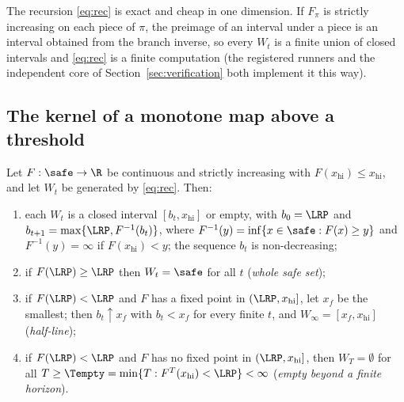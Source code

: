 The recursion \eqref{eq:rec} is exact and cheap in one dimension. If $F_\pi$ is strictly increasing on each piece of $\pi$, the preimage of an interval under a piece is an interval obtained from the branch inverse, so every $W_t$ is a finite union of closed intervals and \eqref{eq:rec} is a finite computation (the registered runners and the independent core of Section~\ref{sec:verification} both implement it this way).

\subsection{The kernel of a monotone map above a threshold}

\begin{theorem}\label{thm:kernel}
Let $F:\safe\to\R$ be continuous and strictly increasing with $F(x_{\mathrm{hi}})\le x_{\mathrm{hi}}$, and let $W_t$ be generated by \eqref{eq:rec}. Then:
\begin{enumerate}[label=(\alph*)]
\item each $W_t$ is a closed interval $[b_t,x_{\mathrm{hi}}]$ or empty, with $b_0=\LRP$ and $b_{t+1}=\max\{\LRP,F^{-1}(b_t)\}$, where $F^{-1}(y)=\inf\{x\in\safe:F(x)\ge y\}$ and $F^{-1}(y)=\infty$ if $F(x_{\mathrm{hi}})<y$; the sequence $b_t$ is non-decreasing;
\item if $F(\LRP)\ge\LRP$ then $W_t=\safe$ for all $t$ (\emph{whole safe set});
\item if $F(\LRP)<\LRP$ and $F$ has a fixed point in $(\LRP,x_{\mathrm{hi}}]$, let $x_f$ be the smallest; then $b_t\uparrow x_f$ with $b_t<x_f$ for every finite $t$, and $W_\infty=[x_f,x_{\mathrm{hi}}]$ (\emph{half-line});
\item if $F(\LRP)<\LRP$ and $F$ has no fixed point in $(\LRP,x_{\mathrm{hi}}]$, then $W_T=\emptyset$ for all $T\ge\Tempty=\min\{T:F^{T}(x_{\mathrm{hi}})<\LRP\}<\infty$ (\emph{empty beyond a finite horizon}).
\end{enumerate}
\end{theorem}
